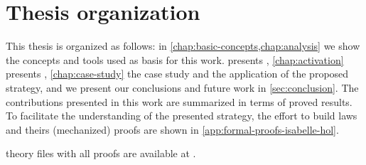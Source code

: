 \section{Thesis organization}

This thesis is organized as follows: in \cref{chap:basic-concepts,chap:analysis} we show the concepts and tools used as basis for this work.
 presents , \cref{chap:activation} presents , \cref{chap:case-study} the case study and the application of the proposed strategy, and we present our conclusions and future work in \cref{sec:conclusion}.
The contributions presented in this work are summarized in terms of proved results.
To facilitate the understanding of the presented strategy, the effort to build laws and theirs (mechanized) proofs are shown in \cref{app:formal-proofs-isabelle-hol}.

 theory files with all proofs are available at \algebraurl.